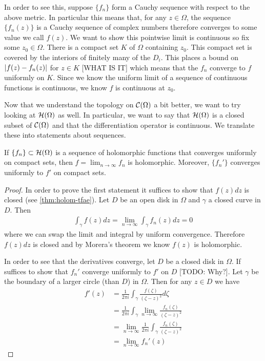 In order to see this, suppose $\{f_n\}$ form a Cauchy sequence with respect to the above metric. In particular this means that, for any $z \in \Omega$, the sequence $\{f_n(z)\}$ is a Cauchy sequence of complex numbers therefore converges to some value we call $f(z)$. We want to show this pointwise limit is continuous so fix some $z_0 \in \Omega$. There is a compact set $K$ of $\Omega$ containing $z_0$. This compact set is covered by the interiors of finitely many of the $D_i$. This places a bound on $\left|f(z) - f_n(z)\right|$ for $z \in K$ [WHAT IS IT] which means that the $f_n$ converge to $f$ uniformly on $K$. Since we know the uniform limit of a sequence of continuous functions is continuous, we know $f$ is continuous at $z_0$.



\secbreak


Now that we understand the topology on $\mathcal{C}(\Omega)$ a bit better, we want to try looking at $\mathcal{H}(\Omega)$ as well. In particular, we want to say that $\mathcal{H}(\Omega)$ is a closed subset of $\mathcal{C}(\Omega)$ and that the differentiation operator is continuous. We translate these into statements about sequences.

\begin{theorem}[Weierstrass]
    If $\{f_n\} \subset \mathcal{H}(\Omega)$ is a sequence of holomorphic functions that converges uniformly on compact sets, then $f = \lim_{n \to \infty} f_n$ is holomorphic. Moreover, $\{f_n'\}$ converges uniformly to $f'$ on compact sets.
\end{theorem}
\begin{proof}
    In order to prove the first statement it suffices to show that $f(z) dz$ is closed (see \autoref{thm:holom-tfae}). Let $D$ be an open disk in $\Omega$ and $\gamma$ a closed curve in $D$. Then
    \begin{align*}
        \int_{\gamma} f(z) dz = \lim_{n \to \infty} \int_\gamma f_n(z) dz = 0
    \end{align*}
    where we can swap the limit and integral by uniform convergence. 
    Therefore $f(z) dz$ is closed and by Morera's theorem we know $f(z)$ is holomorphic.

    In order to see that the derivatives converge, let $D$ be a closed disk in $\Omega$. If suffices to show that $f_n'$ converge uniformly to $f'$ on $D$ [TODO: Why?]. Let $\gamma$ be the boundary of a larger circle (than $D$) in $\Omega$. Then for any $z \in D$  we have 
    \begin{align*}
        f'(z) &= \frac{1}{2\pi i} \int_\gamma \frac{f(\zeta)}{(\zeta - z)^2} d\zeta\\
        &= \frac{1}{2\pi i} \int_\gamma \lim_{n \to \infty} \frac{f_n(\zeta)}{(\zeta - z)^2}\\
        &= \lim_{n \to \infty} \frac{1}{2\pi i} \int_\gamma \frac{f_n(\zeta)}{(\zeta - z)^2}\\
        &= \lim_{n \to \infty} f_n'(z)
    \end{align*}
\end{proof}

